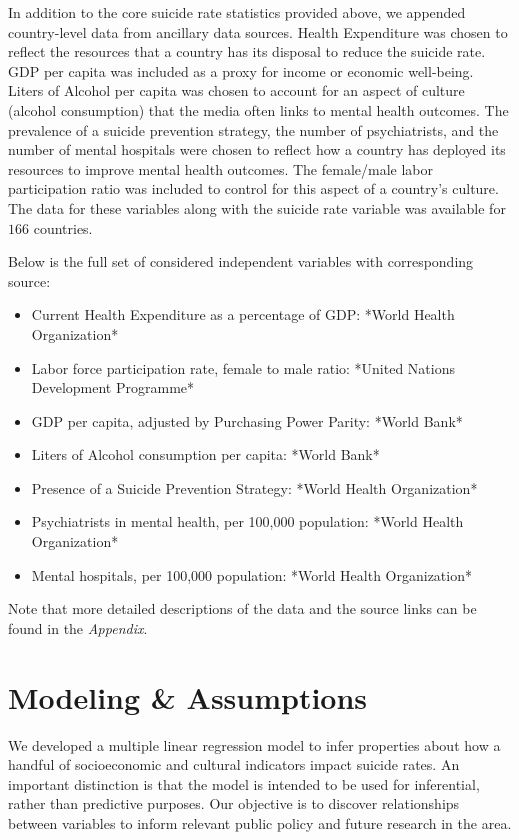 \documentclass[]{article}
\begin{document}
In addition to the core suicide rate statistics provided above, we
appended country-level data from ancillary data sources. Health
Expenditure was chosen to reflect the resources that a country has its
disposal to reduce the suicide rate. GDP per capita was included as a
proxy for income or economic well-being. Liters of Alcohol per capita
was chosen to account for an aspect of culture (alcohol consumption)
that the media often links to mental health outcomes. The prevalence of
a suicide prevention strategy, the number of psychiatrists, and the
number of mental hospitals were chosen to reflect how a country has
deployed its resources to improve mental health outcomes. The
female/male labor participation ratio was included to control for this
aspect of a country's culture. The data for these variables along with
the suicide rate variable was available for \(166\) countries.

Below is the full set of considered independent variables with
corresponding source:

\begin{itemize}
  \item Current Health Expenditure as a percentage of GDP: *World Health Organization*  
  \item Labor force participation rate, female to male ratio: *United Nations Development Programme*
  \item GDP per capita, adjusted by Purchasing Power Parity: *World Bank*
  \item Liters of Alcohol consumption per capita: *World Bank*
  \item Presence of a Suicide Prevention Strategy: *World Health Organization*
  \item Psychiatrists in mental health, per 100,000 population: *World Health Organization*
  \item Mental hospitals, per 100,000 population: *World Health Organization*
\end{itemize}

Note that more detailed descriptions of the data and the source links
can be found in the \emph{Appendix}.

\section{Modeling \& Assumptions}\label{modeling-assumptions}

We developed a multiple linear regression model to infer properties
about how a handful of socioeconomic and cultural indicators impact
suicide rates. An important distinction is that the model is intended to
be used for inferential, rather than predictive purposes. Our objective
is to discover relationships between variables to inform relevant public
policy and future research in the area.
\end{document}

